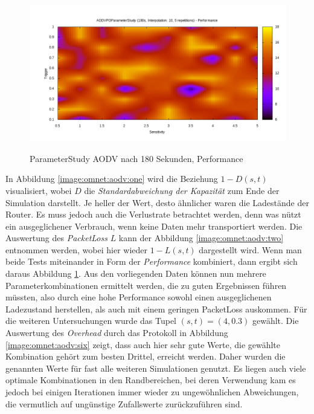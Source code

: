 \begin{figure}
  \centering
  \includegraphics[scale=0.55]{bilder/aps3.png} \\
  \caption{ParameterStudy AODV nach 180 Sekunden, Performance}
  \label{image:omnet:aodv:three}
\end{figure}

In Abbildung \ref{image:omnet:aodv:one} wird die Beziehung $1-D(s,t)$ visualisiert, wobei $D$ die \textit{Standardabweichung der Kapazität} zum Ende der Simulation darstellt. Je heller der Wert, desto ähnlicher waren die Ladestände der Router. Es muss jedoch auch die Verlustrate betrachtet werden, denn was nützt ein ausgeglichener Verbrauch, wenn keine Daten mehr transportiert werden. Die Auswertung des \textit{PacketLoss} $L$ kann der Abbildung \ref{image:omnet:aodv:two} entnommen werden, wobei hier wieder $1-L(s,t)$ dargestellt wird. Wenn man beide Tests miteinander in Form der \og \textit{Performance} kombiniert, dann ergibt sich daraus Abbildung \ref{image:omnet:aodv:three}. Aus den vorliegenden Daten können nun mehrere Parameterkombinationen ermittelt werden, die zu guten Ergebnissen führen müssten, also durch eine hohe Performance sowohl einen ausgeglichenen Ladezustand herstellen, als auch mit einem geringen PacketLoss auskommen. Für die weiteren Untersuchungen wurde das Tupel $(s,t) = (4,0.3)$ gewählt. Die Auswertung des \textit{Overhead} durch das Protokoll in Abbildung \ref{image:omnet:aodv:six} zeigt, dass auch hier sehr gute Werte, die gewählte Kombination gehört zum besten Drittel, erreicht werden. Daher wurden die genannten Werte für fast alle weiteren Simulationen genutzt. Es liegen auch viele optimale Kombinationen in den Randbereichen, bei deren Verwendung kam es jedoch bei einigen Iterationen immer wieder zu ungewöhnlichen Abweichungen, die vermutlich auf ungünstige Zufallswerte zurückzuführen sind.

